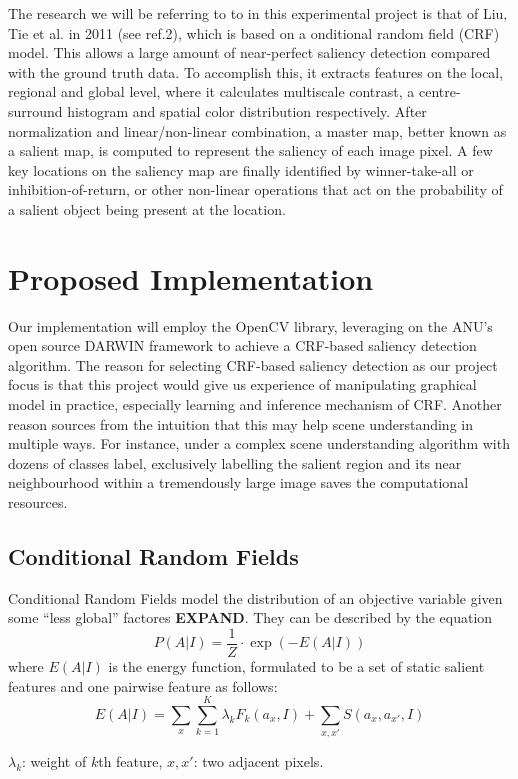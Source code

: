 \documentclass[12pt,a4paper]{article}
\newcommand{\BOLDL}[1]{\textbf{\large #1}}
\newcommand{\htab}{\hspace*{0.63cm}}
\newenvironment{Figure}
  {\par\medskip\noindent\minipage{\linewidth}}
  {\endminipage\par\medskip}
\begin{document}
\begin{multicols}{2}
\begin{Figure}
\end{Figure}
The research we will be referring to to in this experimental project is that of Liu, Tie et al. in 2011 (see ref.2), which is based on a onditional random field (CRF) model.  This allows a large amount of near-perfect saliency detection compared with the ground truth data. To accomplish this, it extracts features on the local, regional and global level, where it calculates multiscale contrast, a centre-surround histogram and spatial color distribution respectively. After normalization and linear/non-linear combination, a master map, better known as a salient map, is computed to represent the saliency of each image pixel. A few key locations on the saliency map are finally identified by winner-take-all or inhibition-of-return, or other non-linear operations that act on the probability of a salient object being present at the location.
\section{Proposed Implementation}
\htab Our implementation will employ the  OpenCV library, leveraging on the ANU's open source DARWIN framework to achieve a CRF-based saliency detection algorithm. The reason for selecting CRF-based saliency detection as our project focus is that this project would give us experience of manipulating graphical model in practice, especially learning and inference mechanism of CRF. Another reason sources from the intuition that this may help scene understanding in multiple ways. For instance, under a complex scene understanding algorithm with dozens of classes label, exclusively labelling the salient region and its near neighbourhood within a tremendously large image saves the computational resources. 
\subsection{Conditional Random Fields}
\htab Conditional Random Fields model the distribution of an objective variable given some ``less global'' factores \BOLDL{EXPAND}.  They can be described by the equation
    $$ P(A|I) = \frac{1}{Z} \cdot\exp(-E(A|I)) $$
where $E(A|I)$ is the energy function, formulated to be a set of static salient features and one pairwise feature as follows:
    $$ E(A|I) = \sum_{x} \sum_{k=1}^{K} \lambda_{k} F_{k}(a_{x},I)  
        + \sum_{x,x'} S(a_{x},a_{x'},I)  $$ \vspace{-0.4cm}
\begin{center} \footnotesize $\lambda_{k}$: weight of $k$th feature, $x,x'$: two adjacent pixels. \end{center} 
%

\end{multicols}
\end{document}
